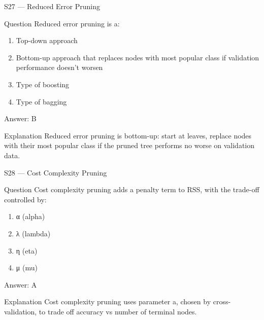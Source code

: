 \documentclass[aspectratio=169,8pt]{beamer}
\begin{document}
	\begin{frame}{S27 --- Reduced Error Pruning}
		\begin{block}{Question}
			Reduced error pruning is a:
			\begin{enumerate}
				\item Top-down approach
				\item Bottom-up approach that replaces nodes with most popular class if validation performance doesn't worsen
				\item Type of boosting
				\item Type of bagging
			\end{enumerate}
		\end{block}
		\begin{exampleblock}{Answer: B}\end{exampleblock}
		\begin{block}{Explanation}
			Reduced error pruning is bottom-up: start at leaves, replace nodes with their most popular class if the pruned tree performs no worse on validation data.
		\end{block}
	\end{frame}
	
	\begin{frame}{S28 --- Cost Complexity Pruning}
		\begin{block}{Question}
			Cost complexity pruning adds a penalty term to RSS, with the trade-off controlled by:
			\begin{enumerate}
				\item α (alpha)
				\item λ (lambda)
				\item η (eta)
				\item μ (mu)
			\end{enumerate}
		\end{block}
		\begin{exampleblock}{Answer: A}\end{exampleblock}
		\begin{block}{Explanation}
			Cost complexity pruning uses parameter a, chosen by cross-validation, to trade off accuracy vs number of terminal nodes.
		\end{block}
	\end{frame}
	
\end{document}
